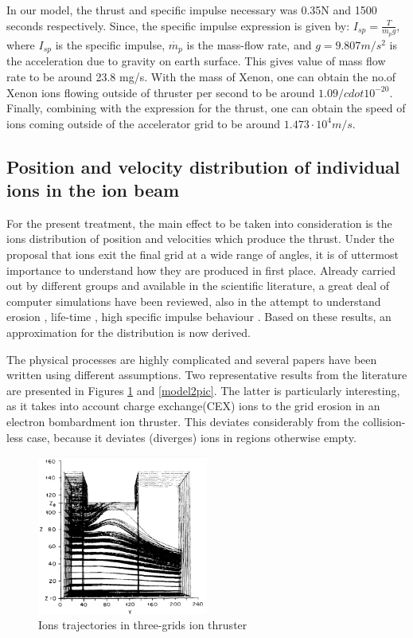 \documentclass[twocolumn,12pt]{article}
\numberwithin{equation}{section} %
\numberwithin{equation}{section}
\begin{document}
In our model, the thrust and specific impulse necessary was 0.35N and 1500 seconds respectively. Since, the specific impulse expression is given by:
$I_{sp}=\frac{T}{\dot{m_p}g}$, where $I_{sp}$ is the specific impulse, $\dot{m_p}$ is the mass-flow rate, and $g=9.807m/s^2$ is the acceleration due to gravity on earth surface.
This gives value of mass flow rate to be around 23.8 mg/s. With the mass of Xenon, one can obtain the no.of Xenon ions flowing outside of thruster per second to be around $1.09 /cdot 10^{-20}$. Finally, combining with the expression for the thrust, one can obtain the speed of ions coming outside of the accelerator grid to be around $1.473 \cdot 10^4 m/s$.

\subsection{Position and velocity distribution of individual ions in the ion beam}
\label{distribution}

For the present treatment, the main effect to be taken into consideration is the ions distribution of position and velocities which produce the thrust. Under the proposal that ions exit the final grid at a wide range of angles, it is of uttermost importance to understand how they are produced in first place. Already carried out by different groups and available in the scientific literature, a great deal of computer simulations have been reviewed, also in the attempt to understand erosion \cite{erosion}, life-time \cite{lifetime1} \cite{lifetime2}, high specific impulse behaviour \cite{highspecificimpulse}. Based on these results, an approximation for the distribution is now derived.

The physical processes are highly complicated and several papers have been written using different assumptions. Two representative results from the literature are presented in Figures \ref{model1pic} and \ref{model2pic}. The latter is particularly interesting, as it takes into account charge exchange(CEX) ions to the grid erosion in an electron bombardment ion thruster. This deviates considerably from the collision-less case, because it deviates (diverges) ions in regions otherwise empty.

\begin{figure}[H]
    \centering
    \includegraphics[width=0.5\textwidth]{figs/model1.PNG}
    \caption{Ions trajectories in three-grids ion thruster \cite{model1ref}}
    \label{model1pic}
\end{figure}
\end{document}
